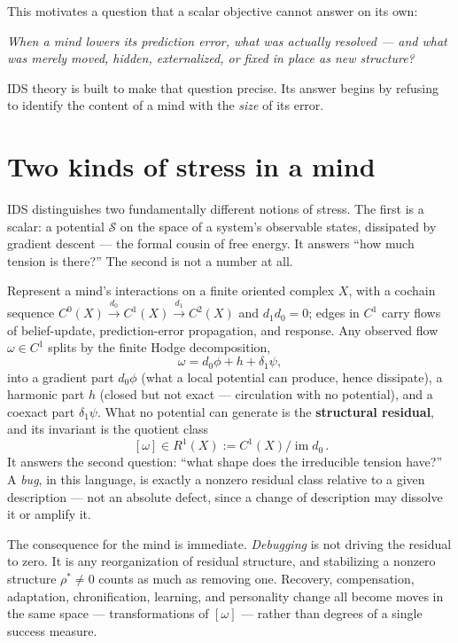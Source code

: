 \documentclass[11pt,a4paper]{article}
\newenvironment{canonbox}{\begin{mdframed}[style=canon]\itshape}{\end{mdframed}}
\theoremstyle{plain}
\begin{document}
This motivates a question that a scalar objective cannot answer on its own:

\begin{canonbox}
When a mind lowers its prediction error, what was actually resolved --- and what was merely moved,
hidden, externalized, or fixed in place as new structure?
\end{canonbox}

IDS theory is built to make that question precise. Its answer begins by refusing to identify the
content of a mind with the \emph{size} of its error.

\section{Two kinds of stress in a mind}\label{sec:stress}

IDS distinguishes two fundamentally different notions of stress. The first is a scalar: a potential
$\mathcal S$ on the space of a system's observable states, dissipated by gradient descent --- the
formal cousin of free energy. It answers ``how much tension is there?'' The second is not a number at
all.

Represent a mind's interactions on a finite oriented complex $X$, with a cochain sequence
$C^0(X)\xrightarrow{d_0}C^1(X)\xrightarrow{d_1}C^2(X)$ and $d_1d_0=0$; edges in $C^1$ carry flows of
belief-update, prediction-error propagation, and response. Any observed flow $\omega\in C^1$ splits by
the finite Hodge decomposition,
\begin{equation}
\omega=d_0\phi+h+\delta_1\psi,
\end{equation}
into a gradient part $d_0\phi$ (what a local potential can produce, hence dissipate), a harmonic part
$h$ (closed but not exact --- circulation with no potential), and a coexact part $\delta_1\psi$. What no
potential can generate is the \textbf{structural residual}, and its invariant is the quotient class
\begin{equation}
\boxed{\,[\omega]\in R^1(X):=C^1(X)/\operatorname{im}d_0\,.}
\label{eq:residual}
\end{equation}
It answers the second question: ``what shape does the irreducible tension have?'' A \emph{bug}, in this
language, is exactly a nonzero residual class relative to a given description --- not an absolute defect,
since a change of description may dissolve it or amplify it.

The consequence for the mind is immediate. \emph{Debugging} is not driving the residual to zero. It is
any reorganization of residual structure, and stabilizing a nonzero structure $\rho^\ast\ne0$ counts as
much as removing one. Recovery, compensation, adaptation, chronification, learning, and personality
change all become moves in the same space --- transformations of $[\omega]$ --- rather than degrees of a
single success measure.
\end{document}
